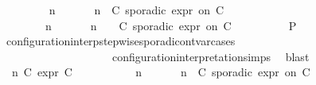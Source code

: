 \begin{isabellebody}
\ \ \ \ \ \ \isamarkupfalse%
\ {\isacartoucheopen}{\isacharparenleft}{\isasymGamma}\ n\ {\isasymturnstile}\ {\isasymPsi}\ {\isasymtriangleright}\ {\isasymPhi}\ {\isacharequal}\ {\isacharparenleft}{\isasymGamma}{\isacharcomma}\ n\ {\isasymturnstile}\ {\isacharparenleft}C\ sporadic{\isasymsharp}\ {\isasymtau}\isactrlsub e\isactrlsub x\isactrlsub p\isactrlsub r\ on\ C\ {\isacharhash}\ {\isasymPsi}\ {\isasymtriangleright}\ {\isasymPhi}{\isacharparenright}{\isacartoucheclose}\isanewline
\ \ \ \ \ \ \ {\isacartoucheopen}{\isacharparenleft}{\isasymGamma}\ n\ {\isasymturnstile}\ {\isasymPsi}\ {\isasymtriangleright}\ {\isasymPhi}\ {\isacharequal}\ {\isacharparenleft}{\isasymGamma}{\isacharcomma}\ n\ {\isasymturnstile}\ {\isasymPsi}\ {\isasymtriangleright}\ {\isacharparenleft}{\isacharparenleft}C\ sporadic{\isasymsharp}\ {\isasymtau}\isactrlsub e\isactrlsub x\isactrlsub p\isactrlsub r\ on\ C\ {\isacharhash}\ {\isasymPhi}{\isacharparenright}{\isacharparenright}{\isacartoucheclose}\isanewline
\ \ \ \ \ \ \isamarkupfalse%
\ {\isacharquery}P\ \isamarkupfalse%
\ configuration{\isacharunderscore}interp{\isacharunderscore}stepwise{\isacharunderscore}sporadicon{\isacharunderscore}tvar{\isacharunderscore}cases\isanewline
\ \ \ \ \ \ \ \ \ \ \ \ \ \ \ \ \ \ \ \ configuration{\isacharunderscore}interpretation{\isachardot}simps\ \isamarkupfalse%
\ blast\isanewline
\ \ \ \ \isamarkupfalse%
\isanewline
\ \ \ \ \ \ \isamarkupfalse%
\ {\isasymGamma}\ n\ C\ {\isasymtau}\isactrlsub e\isactrlsub x\isactrlsub p\isactrlsub r\ C\ {\isasymPsi}\ {\isasymPhi}\isanewline
\ \ \ \ \ \ \isamarkupfalse%
\ {\isacartoucheopen}{\isacharparenleft}{\isasymGamma}\ n\ {\isasymturnstile}\ {\isasymPsi}\ {\isasymtriangleright}\ {\isasymPhi}\ {\isacharequal}\ {\isacharparenleft}{\isasymGamma}{\isacharcomma}\ n\ {\isasymturnstile}\ {\isacharparenleft}C\ sporadic{\isasymsharp}\ {\isasymtau}\isactrlsub e\isactrlsub x\isactrlsub p\isactrlsub r\ on\ C\ {\isacharhash}\ {\isasymPsi}\ {\isasymtriangleright}\ {\isasymPhi}{\isacharparenright}{\isacartoucheclose}\isanewline

\end{isabellebody}
